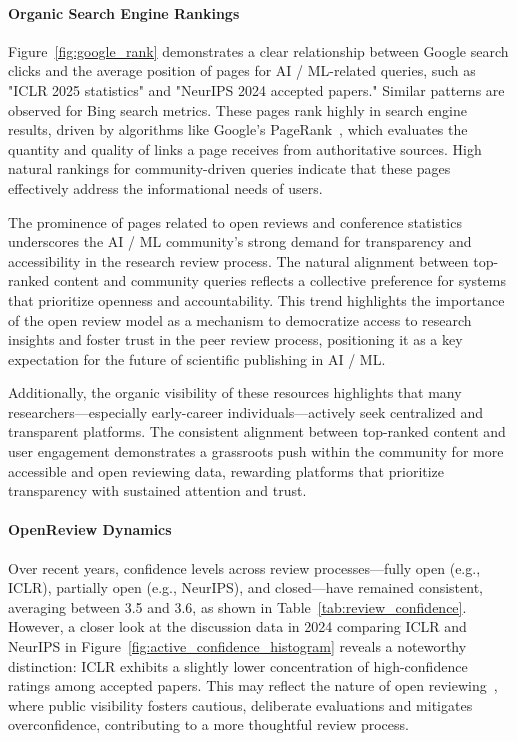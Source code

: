 
\paragraph{Organic Search Engine Rankings}
Figure~\ref{fig:google_rank} demonstrates a clear relationship between Google search clicks and the average position of pages for AI / ML-related queries, such as "ICLR 2025 statistics" and "NeurIPS 2024 accepted papers." Similar patterns are observed for Bing search metrics. These pages rank highly in search engine results, driven by algorithms like Google’s PageRank~\cite{page1999pagerank}, which evaluates the quantity and quality of links a page receives from authoritative sources. High natural rankings for community-driven queries indicate that these pages effectively address the informational needs of users.

The prominence of pages related to open reviews and conference statistics underscores the AI / ML community’s strong demand for transparency and accessibility in the research review process. The natural alignment between top-ranked content and community queries reflects a collective preference for systems that prioritize openness and accountability. This trend highlights the importance of the open review model as a mechanism to democratize access to research insights and foster trust in the peer review process, positioning it as a key expectation for the future of scientific publishing in AI / ML.

Additionally, the organic visibility of these resources highlights that many researchers—especially early-career individuals—actively seek centralized and transparent platforms. The consistent alignment between top-ranked content and user engagement demonstrates a grassroots push within the community for more accessible and open reviewing data, rewarding platforms that prioritize transparency with sustained attention and trust.

\paragraph{OpenReview Dynamics}



Over recent years, confidence levels across review processes—fully open (e.g., ICLR), partially open (e.g., NeurIPS), and closed—have remained consistent, averaging between 3.5 and 3.6, as shown in Table~\ref{tab:review_confidence}. However, a closer look at the discussion data in 2024 comparing ICLR and NeurIPS in Figure~\ref{fig:active_confidence_histogram} reveals a noteworthy distinction: ICLR exhibits a slightly lower concentration of high-confidence ratings among accepted papers. This may reflect the nature of open reviewing~\cite{bharti2022confident}, where public visibility fosters cautious, deliberate evaluations and mitigates overconfidence, contributing to a more thoughtful review process. 

